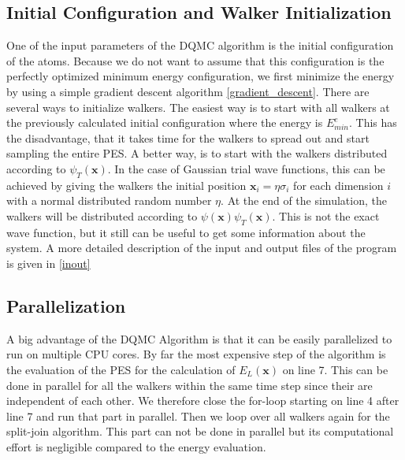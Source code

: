 \documentclass [12pt]{report}
\begin{document}
\subsection{Initial Configuration and Walker Initialization}
One of the input parameters of the DQMC algorithm is the initial configuration of the atoms. Because we do not want to assume that this configuration is the perfectly optimized minimum energy configuration, we first minimize the energy by using a simple gradient descent algorithm \ref{gradient_descent}.
There are several ways to initialize walkers. The easiest way is to start with all walkers at the previously calculated initial configuration where the energy is $E^e_{min}$. This has the disadvantage, that it takes time for the walkers to spread out and start sampling the entire PES. A better way, is to start with the walkers distributed according to $\psi_T(\bm{x})$. In the case of Gaussian trial wave functions, this can be achieved by giving the walkers the initial position $\bm{x}_i = \eta \sigma_i$ for each dimension $i$ with a normal distributed random number $\eta$.
At the end of the simulation, the walkers will be distributed according to $\psi(\bm{x})\psi_T(\bm{x})$. This is not the exact wave function, but it still can be useful to get some information about the system. A more detailed description of the input and output files of the program is given in \ref{inout}
\subsection{Parallelization}
A big advantage of the DQMC Algorithm is that it can be easily parallelized to run on multiple CPU cores. By far the most expensive step of the algorithm is the evaluation of the PES for the calculation of $E_L(\bm{x})$ on line 7. This can be done in parallel for all the walkers within the same time step since their are independent of each other. We therefore close the for-loop starting on line 4 after line 7 and run that part in parallel. Then we loop over all walkers again for the split-join algorithm. This part can not be done in parallel but its computational effort is negligible compared to the energy evaluation.
\end{document}
